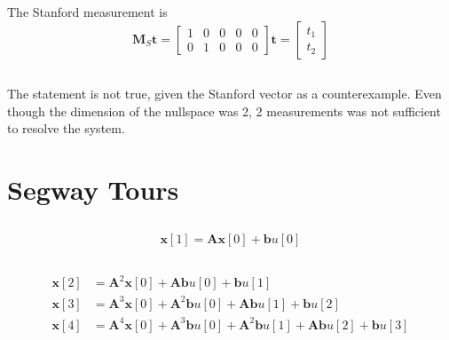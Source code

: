 \documentclass[]{article}
\numberwithin{equation}{section}
\begin{document}
The Stanford measurement is 
\begin{equation}
	\mathbf{M}_{S} \mathbf{t} = \begin{bmatrix}
	1 & 0 & 0 & 0 & 0 \\
	0 & 1 & 0 & 0 & 0
	\end{bmatrix} \mathbf{t}
	=
	\begin{bmatrix}
	t_1 \\
	t_2
	\end{bmatrix}
\end{equation}

\subsection{}

The statement is not true, given the Stanford vector as a counterexample. Even though the dimension of the nullspace was 2, 2 measurements was not sufficient to resolve the system. 

\section{Segway Tours}

\subsection{}

\begin{equation}
	\mathbf{x}[1] = \mathbf{Ax}[0] + \mathbf{b}u[0]
\end{equation}

\subsection{}

\begin{align}
	\mathbf{x}[2] &= \mathbf{A}^2 \mathbf{x}[0] + \mathbf{Ab} u[0] + \mathbf{b} u[1] \\
	\mathbf{x}[3] &= \mathbf{A}^3 \mathbf{x}[0] + \mathbf{A}^2 \mathbf{b} u[0] + \mathbf{A} \mathbf{b} u[1] + \mathbf{b} u[2] \\
	\mathbf{x}[4] &= \mathbf{A}^4 \mathbf{x}[0] + \mathbf{A}^3 \mathbf{b} u[0] + \mathbf{A}^2 \mathbf{b} u[1] + \mathbf{A} \mathbf{b} u[2] + \mathbf{b} u[3]
\end{align}

\subsection{}
\end{document}
